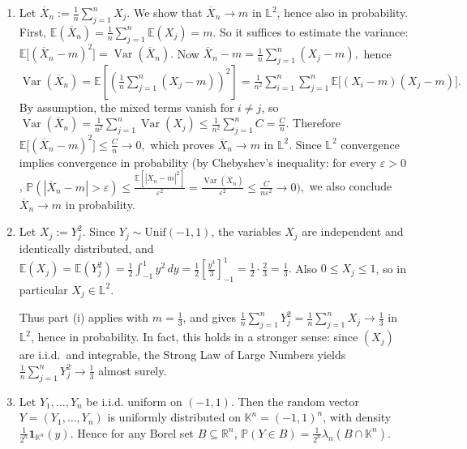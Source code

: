 \documentclass[letterpaper]{article}
\begin{document}
		\begin{enumerate}
			
			\item[(i)] Let
			$
			\overline{X}_n:=\frac{1}{n}\sum_{j=1}^n X_j.
			$
			We show that $\overline{X}_n\to m$ in $\mathbb{L}^2$, hence also in probability. First,
			$
			\mathbb{E}(\overline{X}_n)=\frac{1}{n}\sum_{j=1}^n \mathbb{E}(X_j)=m.
			$
			So it suffices to estimate the variance:
			$
			\mathbb{E}\bigl[(\overline{X}_n-m)^2\bigr]
			=
			\operatorname{Var}(\overline{X}_n).
			$
			Now
			$
			\overline{X}_n-m=\frac{1}{n}\sum_{j=1}^n (X_j-m),
			$
			hence
			$
			\operatorname{Var}(\overline{X}_n)
			=
			\mathbb{E}\!\left[\left(\frac{1}{n}\sum_{j=1}^n (X_j-m)\right)^2\right]
			=
			\frac{1}{n^2}\sum_{i=1}^n\sum_{j=1}^n
			\mathbb{E}\bigl[(X_i-m)(X_j-m)\bigr].
			$
			By assumption, the mixed terms vanish for $i\ne j$, so
			$
			\operatorname{Var}(\overline{X}_n)
			=
			\frac{1}{n^2}\sum_{j=1}^n \operatorname{Var}(X_j)
			\le
			\frac{1}{n^2}\sum_{j=1}^n C
			=
			\frac{C}{n}.
			$
			Therefore
			$
			\mathbb{E}\bigl[(\overline{X}_n-m)^2\bigr]\le \frac{C}{n}\to 0,
			$
			which proves $\overline{X}_n\to m$ in $\mathbb{L}^2$.
			Since $\mathbb{L}^2$ convergence implies convergence in probability
			(by Chebyshev's inequality: for every $\varepsilon>0$,
			$
			\mathbb{P}(|\overline{X}_n-m|>\varepsilon)
			\le
			\frac{\mathbb{E}[|\overline{X}_n-m|^2]}{\varepsilon^2}
			=
			\frac{\operatorname{Var}(\overline{X}_n)}{\varepsilon^2}
			\le
			\frac{C}{n\varepsilon^2}
			\to 0),
			$
			we also conclude $\overline{X}_n\to m$ in probability.
			
			\item[(ii)] Let $X_j:=Y_j^2$. Since $Y_j\sim \mathrm{Unif}(-1,1)$, the variables $X_j$ are independent and identically distributed, and
			$
			\mathbb{E}(X_j)=\mathbb{E}(Y_j^2)
			=
			\frac{1}{2}\int_{-1}^1 y^2\,dy
			=
			\frac{1}{2}\left[\frac{y^3}{3}\right]_{-1}^{1}
			=
			\frac{1}{2}\cdot\frac{2}{3}
			=
			\frac{1}{3}.
			$
			Also $0\le X_j\le 1$, so in particular $X_j\in\mathbb{L}^2$.
			
			Thus part (i) applies with $m=\frac{1}{3}$, and gives
			$
			\frac{1}{n}\sum_{j=1}^n Y_j^2
			=
			\frac{1}{n}\sum_{j=1}^n X_j
			\to
			\frac{1}{3}
			$
			in $\mathbb{L}^2$, hence in probability. In fact, this holds in a stronger sense: since $(X_j)$ are i.i.d.\ and integrable, the Strong Law of Large Numbers yields
			$
			\frac{1}{n}\sum_{j=1}^n Y_j^2 \to \frac{1}{3}
			$
			almost surely.
			
			\item[(iii)] Let $Y_1,\dots,Y_n$ be i.i.d. uniform on $(-1,1)$. Then the random vector
			$
			Y=(Y_1,\dots,Y_n)
			$
			is uniformly distributed on $\mathbb{K}^n=(-1,1)^n$, with density
			$
			\frac{1}{2^n}\mathbf{1}_{\mathbb{K}^n}(y).
			$
			Hence for any Borel set $B\subseteq \mathbb{R}^n$,
			$
			\mathbb{P}(Y\in B)=\frac{1}{2^n}\lambda_n(B\cap \mathbb{K}^n).
			$
			

\end{enumerate}
\end{document}
